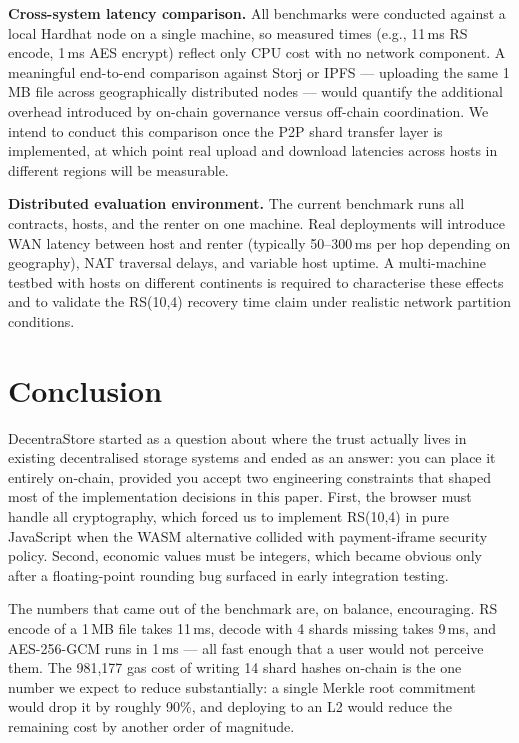 \documentclass[journal]{IEEEtran}
\newcommand{\FileSizeMB}{1\,MB}
\newcommand{\AESEncryptMs}{1\,ms}
\newcommand{\RSEncodeMs}{11\,ms}
\newcommand{\RSDecodeMs}{9\,ms}
\newcommand{\RSParity}{4}
\newcommand{\UploadFileMapGas}{981{,}177}
\begin{document}
\noindent\textbf{Cross-system latency comparison.}
All benchmarks were conducted against a local Hardhat node on a single
machine, so measured times (e.g., \RSEncodeMs{} RS encode,
\AESEncryptMs{} AES encrypt) reflect only CPU cost with no network
component.
%
A meaningful end-to-end comparison against Storj or IPFS — uploading
the same \FileSizeMB{} file across geographically distributed nodes —
would quantify the additional overhead introduced by on-chain governance
versus off-chain coordination.
%
We intend to conduct this comparison once the P2P shard transfer layer
is implemented, at which point real upload and download latencies across
hosts in different regions will be measurable.

\noindent\textbf{Distributed evaluation environment.}
The current benchmark runs all contracts, hosts, and the renter on one
machine.
%
Real deployments will introduce WAN latency between host and renter
(typically 50–300\,ms per hop depending on geography), NAT traversal
delays, and variable host uptime.
%
A multi-machine testbed with hosts on different continents is required
to characterise these effects and to validate the RS(10,4) recovery
time claim under realistic network partition conditions.

\section{Conclusion}

DecentraStore started as a question about where the trust actually lives
in existing decentralised storage systems and ended as an answer: you can
place it entirely on-chain, provided you accept two engineering constraints
that shaped most of the implementation decisions in this paper.
%
First, the browser must handle all cryptography, which forced us to
implement RS(10,4) in pure JavaScript when the WASM alternative collided
with payment-iframe security policy.
%
Second, economic values must be integers, which became obvious only after
a floating-point rounding bug surfaced in early integration testing.

The numbers that came out of the benchmark are, on balance, encouraging.
RS encode of a \FileSizeMB{} file takes \RSEncodeMs{}, decode with
\RSParity{} shards missing takes \RSDecodeMs{}, and AES-256-GCM runs in
\AESEncryptMs{} — all fast enough that a user would not perceive them.
The \UploadFileMapGas{} gas cost of writing 14 shard hashes on-chain is
the one number we expect to reduce substantially: a single Merkle root
commitment would drop it by roughly 90\%, and deploying to an L2 would
reduce the remaining cost by another order of magnitude.
\end{document}
